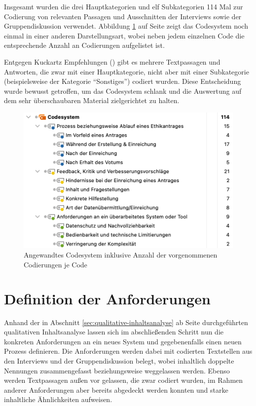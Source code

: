 \documentclass[a4paper,12pt,twoside]{scrreprt}
\begin{document}
Insgesamt wurden die drei Hauptkategorien und elf Subkategorien 114 Mal zur Codierung von relevanten Passagen und Ausschnitten der Interviews sowie der Gruppendiskussion verwendet. Abbildung \ref{fig:codesystem-anzahl} auf Seite \pageref{fig:codesystem-anzahl} zeigt das Codesystem noch einmal in einer anderen Darstellungsart, wobei neben jedem einzelnen Code die entsprechende Anzahl an Codierungen aufgelistet ist.

Entgegen Kuckartz Empfehlungen (\cite[108]{kuckartz_qualitative_2018}) gibt es mehrere Textpassagen und Antworten, die zwar mit einer Hauptkategorie, nicht aber mit einer Subkategorie (beispielsweise der Kategorie \enquote{Sonstiges}) codiert wurden. Diese Entscheidung wurde bewusst getroffen, um das Codesystem schlank und die Auswertung auf dem sehr überschaubaren Material zielgerichtet zu halten.

\begin{figure}[ht]
    \centering
    \includegraphics[width=.8\linewidth]{thesis/images/Luidold_Codesystem-Anzahl.png}
    \caption{Angewandtes Codesystem inklusive Anzahl der vorgenommenen Codierungen je Code}
    \label{fig:codesystem-anzahl}
\end{figure}

\section{Definition der Anforderungen}
\label{sec:definition-anforderungen}

Anhand der in Abschnitt \ref{sec:qualitative-inhaltsanalyse} ab Seite \pageref{sec:qualitative-inhaltsanalyse} durchgeführten qualitativen Inhaltsanalyse lassen sich im abschließenden Schritt nun die konkreten Anforderungen an ein neues System und gegebenenfalls einen neuen Prozess definieren. Die Anforderungen werden dabei mit codierten Textstellen aus den Interviews und der Gruppendiskussion belegt, wobei inhaltlich doppelte Nennungen zusammengefasst beziehungsweise weggelassen werden. Ebenso werden Textpassagen außen vor gelassen, die zwar codiert wurden, im Rahmen anderer Anforderungen aber bereits abgedeckt werden konnten und starke inhaltliche Ähnlichkeiten aufweisen.
\end{document}
